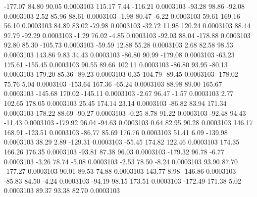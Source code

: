      -177.07       84.80       90.05     0.0003103
      115.17        7.44     -116.21     0.0003103
      -93.28       98.86      -92.08     0.0003103
        2.52       85.96       88.61     0.0003103
       -1.98       80.47       -6.22     0.0003103
       59.61      169.16       56.10     0.0003103
       84.89       83.02      -79.98     0.0003103
      -32.72       11.98      120.24     0.0003103
       88.44       97.79      -92.29     0.0003103
       -1.29       76.02       -4.85     0.0003103
      -92.03       88.04     -178.88     0.0003103
       92.80       85.30     -105.73     0.0003103
      -59.59       12.88       55.28     0.0003103
        2.68       82.58       98.53     0.0003103
      143.86        9.83       34.43     0.0003103
      -86.80       90.99     -179.08     0.0003103
      -63.23      175.61     -155.45     0.0003103
       90.55       89.66      102.11     0.0003103
      -86.80       93.95      -80.13     0.0003103
      179.20       85.36      -89.23     0.0003103
        0.35      104.79      -89.45     0.0003103
     -178.02       75.76        5.04     0.0003103
     -153.64      167.36      -65.24     0.0003103
       88.98       89.00      165.67     0.0003103
     -145.68      170.02     -145.11     0.0003103
       -2.67       96.47       -1.57     0.0003103
        2.77      102.65      178.05     0.0003103
       25.45      174.14       23.14     0.0003103
      -86.82       83.94      171.34     0.0003103
      178.22       88.69      -90.27     0.0003103
       -0.25        8.78       91.22     0.0003103
      -92.48       94.43      -11.43     0.0003103
     -179.92       96.04      -94.63     0.0003103
        0.64       82.95       90.28     0.0003103
      146.17      168.91     -123.51     0.0003103
      -86.77       85.69      176.76     0.0003103
       51.41        6.09     -139.98     0.0003103
       38.29        2.89     -129.31     0.0003103
      -55.45      174.82      122.46     0.0003103
      174.35      166.26      176.35     0.0003103
      -93.81       87.38       96.03     0.0003103
     -179.32       96.78       -6.77     0.0003103
       -3.26       78.74       -5.08     0.0003103
       -2.53       78.50       -8.24     0.0003103
       93.90       87.70     -177.27     0.0003103
       90.01       89.53       74.88     0.0003103
      143.77        8.98     -146.86     0.0003103
      -85.83       84.50       -4.24     0.0003103
      -94.19       98.15      173.51     0.0003103
     -172.49      171.38        5.02     0.0003103
       89.37       93.38       82.70     0.0003103
